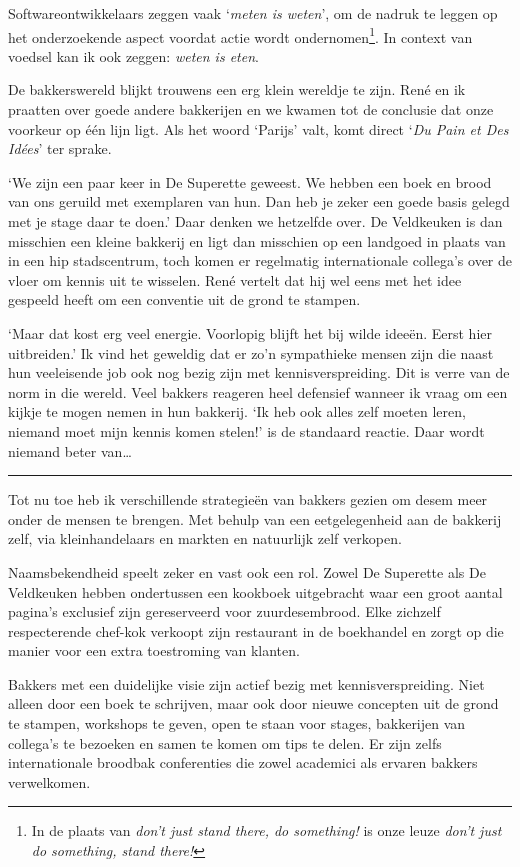 \documentclass[
  11pt,
  dutch,
]{memoir}
\begin{document}
Softwareontwikkelaars zeggen vaak `\emph{meten is weten}', om de nadruk
te leggen op het onderzoekende aspect voordat actie wordt
ondernomen\footnote{In de plaats van \emph{don't just stand there, do
  something!} is onze leuze \emph{don't just do something, stand there!}}.
In context van voedsel kan ik ook zeggen: \emph{weten is eten}.

De bakkerswereld blijkt trouwens een erg klein wereldje te zijn. René en
ik praatten over goede andere bakkerijen en we kwamen tot de conclusie
dat onze voorkeur op één lijn ligt. Als het woord `Parijs' valt, komt
direct `\emph{Du Pain et Des Idées}' ter sprake.

`We zijn een paar keer in De Superette geweest. We hebben een boek en
brood van ons geruild met exemplaren van hun. Dan heb je zeker een goede
basis gelegd met je stage daar te doen.' Daar denken we hetzelfde over.
De Veldkeuken is dan misschien een kleine bakkerij en ligt dan misschien
op een landgoed in plaats van in een hip stadscentrum, toch komen er
regelmatig internationale collega's over de vloer om kennis uit te
wisselen. René vertelt dat hij wel eens met het idee gespeeld heeft om
een conventie uit de grond te stampen.

`Maar dat kost erg veel energie. Voorlopig blijft het bij wilde ideeën.
Eerst hier uitbreiden.' Ik vind het geweldig dat er zo'n sympathieke
mensen zijn die naast hun veeleisende job ook nog bezig zijn met
kennisverspreiding. Dit is verre van de norm in die wereld. Veel bakkers
reageren heel defensief wanneer ik vraag om een kijkje te mogen nemen in
hun bakkerij. `Ik heb ook alles zelf moeten leren, niemand moet mijn
kennis komen stelen!' is de standaard reactie. Daar wordt niemand beter
van\ldots{}

\pfbreak

Tot nu toe heb ik verschillende strategieën van bakkers gezien om desem
meer onder de mensen te brengen. Met behulp van een eetgelegenheid aan
de bakkerij zelf, via kleinhandelaars en markten en natuurlijk zelf
verkopen.

Naamsbekendheid speelt zeker en vast ook een rol. Zowel De Superette als
De Veldkeuken hebben ondertussen een kookboek uitgebracht waar een groot
aantal pagina's exclusief zijn gereserveerd voor zuurdesembrood. Elke
zichzelf respecterende chef-kok verkoopt zijn restaurant in de
boekhandel en zorgt op die manier voor een extra toestroming van
klanten.

Bakkers met een duidelijke visie zijn actief bezig met
kennisverspreiding. Niet alleen door een boek te schrijven, maar ook
door nieuwe concepten uit de grond te stampen, workshops te geven, open
te staan voor stages, bakkerijen van collega's te bezoeken en samen te
komen om tips te delen. Er zijn zelfs internationale broodbak
conferenties die zowel academici als ervaren bakkers verwelkomen.
\end{document}
